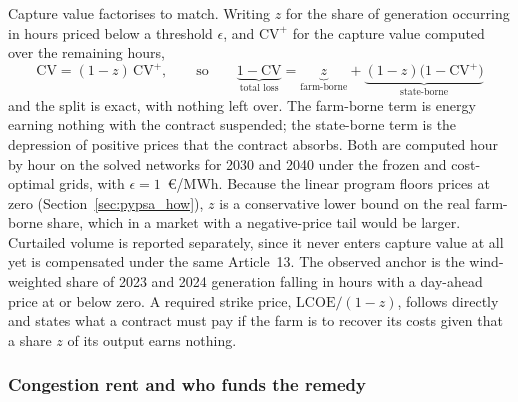 Capture value factorises to match. Writing $z$ for the share of generation
occurring in hours priced below a threshold $\epsilon$, and $\mathrm{CV}^{+}$ for
the capture value computed over the remaining hours,
%
\begin{equation}
    \mathrm{CV} = (1 - z)\,\mathrm{CV}^{+},
    \qquad\text{so}\qquad
    \underbrace{1 - \mathrm{CV}}_{\text{total loss}}
    = \underbrace{z}_{\text{farm-borne}}
    + \underbrace{(1-z)\bigl(1 - \mathrm{CV}^{+}\bigr)}_{\text{state-borne}}
    \label{eq:whopays}
\end{equation}
%
and the split is exact, with nothing left over. The farm-borne term is energy earning
nothing with the contract suspended; the state-borne term is the depression of
positive prices that the contract absorbs. Both are computed hour by hour on the solved networks for
2030 and 2040 under the frozen and cost-optimal grids, with
$\epsilon = 1$~\euro/MWh. Because the linear program floors prices at zero
(Section~\ref{sec:pypsa_how}), $z$ is a conservative lower bound on the real
farm-borne share, which in a market with a negative-price tail would be larger.
Curtailed volume is reported separately, since it never enters capture value at
all yet is compensated under the same Article~13. The observed anchor is the
wind-weighted share of 2023 and 2024 generation falling in hours with a
day-ahead price at or below zero. A required strike price, $\mathrm{LCOE}/(1-z)$,
follows directly and states what a contract must pay if the farm is to recover
its costs given that a share $z$ of its output earns nothing.

\subsubsection*{Congestion rent and who funds the
remedy}\label{sec:rent_method}

